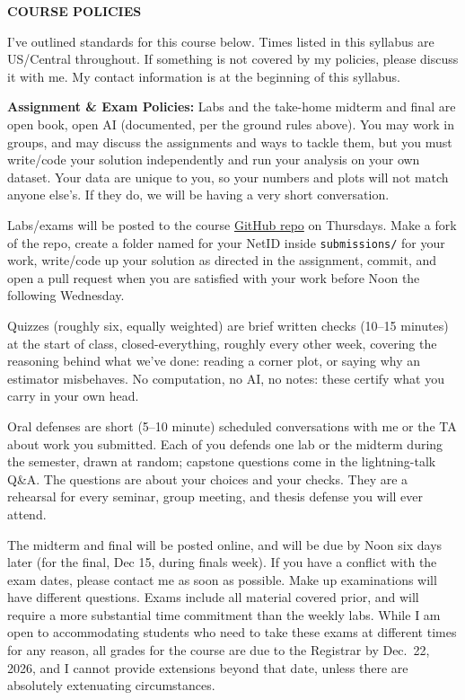 {\large \bf \headerfont \color{RoyalBlue} COURSE POLICIES}

I've outlined standards for this course below. Times listed in this
syllabus are US/Central throughout. If something is not covered by my policies,
please discuss it with me. My contact information is at the beginning of this
syllabus.\\
\medskip

{\bf \headerfont \color{RoyalBlue} Assignment \& Exam Policies:}
Labs and the take-home midterm and final are open book, open
AI (documented, per the ground rules above). You may work in groups, and may
discuss the assignments and ways to tackle them, but you must write/code your
solution independently and run your analysis on your own dataset. Your data
are unique to you, so your numbers and plots will not match anyone else's. If
they do, we will be having a very short conversation.

Labs/exams will be posted to the course
\href{https://github.com/gnarayan/ast457_2026_Fall}{GitHub repo} on Thursdays.
Make a fork of the repo, create a folder named for your NetID inside
\texttt{submissions/} for your work, write/code up your solution as directed
in the assignment, commit, and open a pull request when you are satisfied
with your work before Noon the following Wednesday.

Quizzes (roughly six, equally weighted) are brief written checks (10--15 minutes) at the start of class, closed-everything, roughly every other week, covering the reasoning behind what we've done: reading a corner plot, or saying why an estimator misbehaves. No computation, no AI, no notes: these certify what you carry in your own head.

Oral defenses are short (5--10 minute) scheduled conversations with me or the
TA about work you submitted. Each of you defends one lab or the midterm during the semester, drawn at random; capstone questions come in the lightning-talk Q\&A. The questions are about your
choices and your checks. They are a rehearsal for every seminar, group meeting, and thesis defense you will ever attend.

The midterm and final will be posted online, and will be
due by Noon six days later (for the final, Dec 15, during finals week). If you have a
conflict with the exam dates, please contact me as soon as possible. Make up
examinations will have different questions. Exams include all material covered
prior, and will require a more substantial time commitment than the weekly
labs. While I am open to accommodating students who need to take these exams at different times for any reason, all grades for the course are due to
the Registrar by Dec.~22, 2026, and I cannot provide extensions beyond that
date, unless there are absolutely extenuating circumstances.
\medskip

